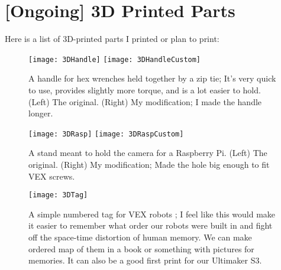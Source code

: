 \section{[Ongoing] 3D Printed Parts}
Here is a list of 3D-printed parts I printed or plan to print:

\begin{figure}[h]
    \centering
    \texttt{[image: 3DHandle]}
    \texttt{[image: 3DHandleCustom]}
    \caption{
        A handle for hex wrenches held together by a zip tie; It's very quick to use, provides slightly more torque, and is a lot easier to hold. (Left) The original. \cite{3DHandle} (Right) My modification; I made the handle longer.
    }
\end{figure}


\begin{figure}[h]
    \centering
    \texttt{[image: 3DRasp]}
    \texttt{[image: 3DRaspCustom]}
    \caption{
        A stand meant to hold the camera for a Raspberry Pi. (Left) The original. \cite{3DRasp} (Right) My modification; Made the hole big enough to fit VEX screws.
    }
\end{figure}

\begin{figure}[h]
    \centering
    \texttt{[image: 3DTag]}
    \caption{
        A simple numbered tag for VEX robots \cite{3DTag}; I feel like this would make it easier to remember what order our robots were built in and fight off the space-time distortion of human memory. We can make ordered map of them in a book or something with pictures for memories. It can also be a good first print for our Ultimaker S3.
    }
\end{figure}
